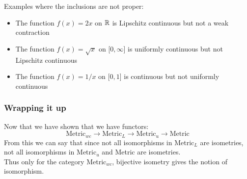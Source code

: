 \begin{frame}
    Examples where the inclusions are not proper:
    \begin{itemize}
        \item The function \(f(x)=2x\) on \(\mathbb{R}\) is Lipschitz continuous but not a weak contraction
        \item The function \(f(x)=\sqrt{x}\) on [\(0,\infty\)] is uniformly continuous but not Lipschitz continuous
        \item The function \(f(x)=1/x\) on [\(0,1\)] is continuous but not uniformly continuous
    \end{itemize}
\end{frame}

\begin{frame}
    \frametitle{Wrapping it up}
    Now that we have shown that we have functors:
    \begin{equation*}
        \text{Metric}_{wc} \rightarrow \text{Metric}_L \rightarrow \text{Metric}_u \rightarrow \text{Metric}
    \end{equation*}
    \pause
    From this we can say that since not all isomorphisms in Metric\(_{L}\) are isometries, 
    not all isomorphisms in Metric\(_u\) and Metric are isometries.\\
    Thus only for the category Metric\(_{wc}\), bijective isometry gives the notion of isomorphism.

\end{frame}